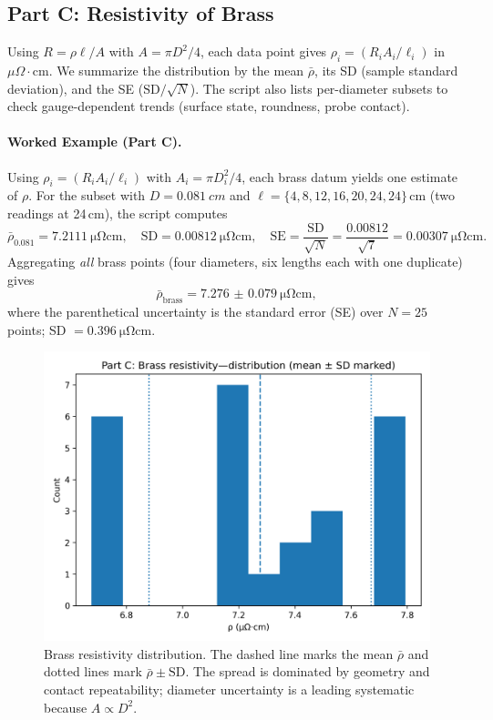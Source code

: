 \documentclass[12pt]{article}
\numberwithin{equation}{section}
\begin{document}
\subsection{Part C: Resistivity of Brass}
Using $R=\rho\ell/A$ with $A=\pi D^2/4$, each data point gives $\rho_i=(R_iA_i/\ell_i)$ in $\mu\Omega\cdot$cm. We summarize the distribution by the mean $\bar\rho$, its SD (sample standard deviation), and the SE ($\mathrm{SD}/\sqrt{N}$). The script also lists per-diameter subsets to check gauge-dependent trends (surface state, roundness, probe contact).
\paragraph*{Worked Example (Part C).}
Using $\rho_i=(R_iA_i/\ell_i)$ with $A_i=\pi D_i^2/4$, each brass datum yields one estimate of $\rho$.
For the subset with $D=\SI{0.081}{cm}$ and $\ell=\{4,8,12,16,20,24,24\}$\,cm (two readings at 24\,cm),
the script computes
\[
\bar\rho_{0.081}=\SI{7.2111}{\micro\ohm\centi\metre},\quad
\mathrm{SD}=\SI{0.00812}{\micro\ohm\centi\metre},\quad
\mathrm{SE}=\frac{\mathrm{SD}}{\sqrt{N}}=\frac{0.00812}{\sqrt{7}}=\SI{0.00307}{\micro\ohm\centi\metre}.
\]
Aggregating \emph{all} brass points (four diameters, six lengths each with one duplicate) gives
\[
\bar\rho_{\text{brass}}=\boxed{\SI{7.276(79)}{\micro\ohm\centi\metre}},
\]
where the parenthetical uncertainty is the standard error (SE) over $N=25$ points; SD $=\SI{0.396}{\micro\ohm\centi\metre}$.

\begin{figure}[h]
  \centering
  \includegraphics[width=0.72\linewidth]{figs/PartC_Brass_rho_hist.png}
  \caption{Brass resistivity distribution. The dashed line marks the mean $\bar\rho$ and dotted lines mark $\bar\rho\pm\mathrm{SD}$. The spread is dominated by geometry and contact repeatability; diameter uncertainty is a leading systematic because $A\propto D^2$.}
  \label{fig:partC}
\end{figure}
\FloatBarrier
\end{document}
